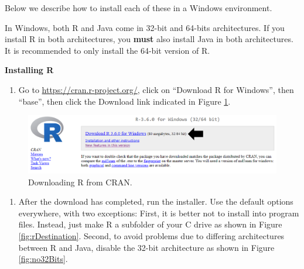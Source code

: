\documentclass[11pt]{book}
\providecommand{\tightlist}{%
  \setlength{\itemsep}{0pt}\setlength{\parskip}{0pt}}
\let\BeginKnitrBlock\begin \let\EndKnitrBlock\end
\begin{document}
Below we describe how to install each of these in a Windows environment.

\BeginKnitrBlock{rmdimportant}
In Windows, both R and Java come in 32-bit and 64-bits architectures. If
you install R in both architectures, you \textbf{must} also install Java
in both architectures. It is recommended to only install the 64-bit
version of R.
\EndKnitrBlock{rmdimportant}

\textbf{Installing R}

\begin{enumerate}
\def\labelenumi{\arabic{enumi}.}
\tightlist
\item
  Go to \url{https://cran.r-project.org/}, click on ``Download R for
  Windows'', then ``base'', then click the Download link indicated in
  Figure \ref{fig:downloadR}.
\end{enumerate}

\begin{figure}

{\centering \includegraphics[width=1\linewidth]{images/OhdsiAnalyticsTools/downloadR} 

}

\caption{Downloading R from CRAN.}\label{fig:downloadR}
\end{figure}

\begin{enumerate}
\def\labelenumi{\arabic{enumi}.}
\setcounter{enumi}{1}
\tightlist
\item
  After the download has completed, run the installer. Use the default
  options everywhere, with two exceptions: First, it is better not to
  install into program files. Instead, just make R a subfolder of your C
  drive as shown in Figure \ref{fig:rDestination}. Second, to avoid
  problems due to differing architectures between R and Java, disable
  the 32-bit architecture as shown in Figure \ref{fig:no32Bits}.
\end{enumerate}
\end{document}
